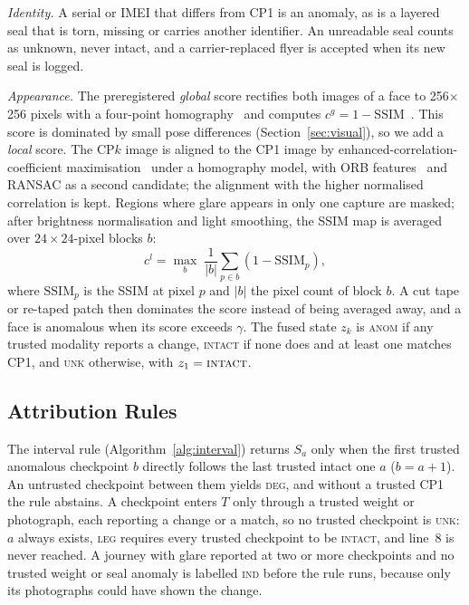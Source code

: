 \documentclass[conference]{IEEEtran}
\newcommand{\LEG}{\textsc{leg}}
\newcommand{\DEG}{\textsc{deg}}
\newcommand{\IND}{\textsc{ind}}
\newcommand{\ANOM}{\textsc{anom}}
\newcommand{\INTACT}{\textsc{intact}}
\newcommand{\UNK}{\textsc{unk}}
\begin{document}
\emph{Identity.} A serial or IMEI that differs from CP1 is an anomaly, as is a layered seal that is torn, missing or carries another identifier. An unreadable seal counts as unknown, never intact, and a carrier-replaced flyer is accepted when its new seal is logged.

\emph{Appearance.} The preregistered \emph{global} score rectifies both images of a face to 256$\times$256 pixels with a four-point homography~\cite{hartley} and computes $c^{g}=1-\mathrm{SSIM}$~\cite{ssim}. This score is dominated by small pose differences (Section~\ref{sec:visual}), so we add a \emph{local} score. The CP$k$ image is aligned to the CP1 image by enhanced-correlation-coefficient maximisation~\cite{ecc} under a homography model, with ORB features~\cite{orb} and RANSAC as a second candidate; the alignment with the higher normalised correlation is kept. Regions where glare appears in only one capture are masked; after brightness normalisation and light smoothing, the SSIM map is averaged over $24\times 24$-pixel blocks $b$:
\begin{equation}
c^{l} = \max_b \; \frac{1}{|b|}\sum_{p\in b} \left(1-\mathrm{SSIM}_p\right),
\end{equation}
where $\mathrm{SSIM}_p$ is the SSIM at pixel $p$ and $|b|$ the pixel count of block $b$. A cut tape or re-taped patch then dominates the score instead of being averaged away, and a face is anomalous when its score exceeds $\gamma$. The fused state $z_k$ is \ANOM{} if any trusted modality reports a change, \INTACT{} if none does and at least one matches CP1, and \UNK{} otherwise, with $z_1=\INTACT$.

\subsection{Attribution Rules}
The interval rule (Algorithm~\ref{alg:interval}) returns $S_a$ only when the first trusted anomalous checkpoint $b$ directly follows the last trusted intact one $a$ ($b=a+1$). An untrusted checkpoint between them yields \DEG, and without a trusted CP1 the rule abstains. A checkpoint enters $T$ only through a trusted weight or photograph, each reporting a change or a match, so no trusted checkpoint is \UNK: $a$ always exists, \LEG{} requires every trusted checkpoint to be \INTACT, and line~8 is never reached. A journey with glare reported at two or more checkpoints and no trusted weight or seal anomaly is labelled \IND{} before the rule runs, because only its photographs could have shown the change.
\end{document}
